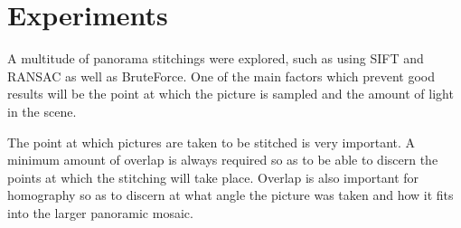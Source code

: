 \documentclass{article}
\begin{document}
\section{Experiments}\label{sec:overview}

A multitude of panorama stitchings were explored, such as using SIFT and RANSAC as well as BruteForce. One of the main factors which prevent good results will be the point at which the picture is sampled and the amount of light in the scene.

The point at which pictures are taken to be stitched is very important. A minimum amount of overlap is always required so as to be able to discern the points at which the stitching will take place. Overlap is also important for homography so as to discern at what angle the picture was taken and how it fits into the larger panoramic mosaic.
\end{document}
